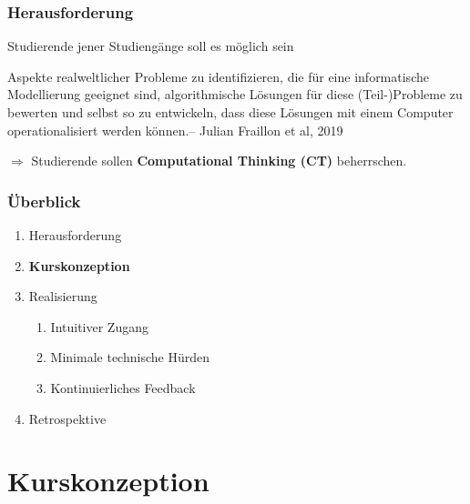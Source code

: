 \documentclass[german,aspectratio=169]{beamer}
\begin{document}
\begin{frame}
	\frametitle{Herausforderung}
	Studierende jener Studiengänge soll es möglich sein
	\begin{quoting}
		\glqq Aspekte realweltlicher Probleme zu identifizieren, die für eine informatische Modellierung geeignet sind, algorithmische Lösungen für diese (Teil-)Probleme zu bewerten und selbst so zu entwickeln, dass diese Lösungen mit einem Computer operationalisiert werden können.\grqq -- Julian Fraillon et al, 2019 \cite{fraillon:2019}
	\end{quoting}

	$\Rightarrow$ Studierende sollen \textbf{Computational Thinking (CT)} beherrschen.
\end{frame}

\begin{frame}
	\frametitle{Überblick}
		\begin{enumerate}[label = \arabic*.]
			\item Herausforderung
			\item \textbf{Kurskonzeption}
			\item Realisierung
			\begin{enumerate}[label = 3.\arabic*]
				\item Intuitiver Zugang
				\item Minimale technische Hürden
				\item Kontinuierliches Feedback
			\end{enumerate}
			\item Retrospektive
		\end{enumerate}
\end{frame}

\section{Kurskonzeption}
\end{document}
